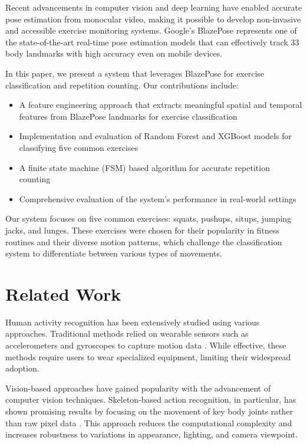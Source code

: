 \documentclass[conference]{IEEEtran}
\begin{document}
Recent advancements in computer vision and deep learning have enabled accurate pose estimation from monocular video, making it possible to develop non-invasive and accessible exercise monitoring systems. Google's BlazePose \cite{blazepose} represents one of the state-of-the-art real-time pose estimation models that can effectively track 33 body landmarks with high accuracy even on mobile devices. 

In this paper, we present a system that leverages BlazePose for exercise classification and repetition counting. Our contributions include:

\begin{itemize}
    \item A feature engineering approach that extracts meaningful spatial and temporal features from BlazePose landmarks for exercise classification
    \item Implementation and evaluation of Random Forest and XGBoost models for classifying five common exercises
    \item A finite state machine (FSM) based algorithm for accurate repetition counting
    \item Comprehensive evaluation of the system's performance in real-world settings
\end{itemize}

Our system focuses on five common exercises: squats, pushups, situps, jumping jacks, and lunges. These exercises were chosen for their popularity in fitness routines and their diverse motion patterns, which challenge the classification system to differentiate between various types of movements.

\section{Related Work}
Human activity recognition has been extensively studied using various approaches. Traditional methods relied on wearable sensors such as accelerometers and gyroscopes to capture motion data \cite{pose_exercise}. While effective, these methods require users to wear specialized equipment, limiting their widespread adoption.

Vision-based approaches have gained popularity with the advancement of computer vision techniques. Skeleton-based action recognition, in particular, has shown promising results by focusing on the movement of key body joints rather than raw pixel data \cite{skeleton_based}. This approach reduces the computational complexity and increases robustness to variations in appearance, lighting, and camera viewpoint.
\end{document}
